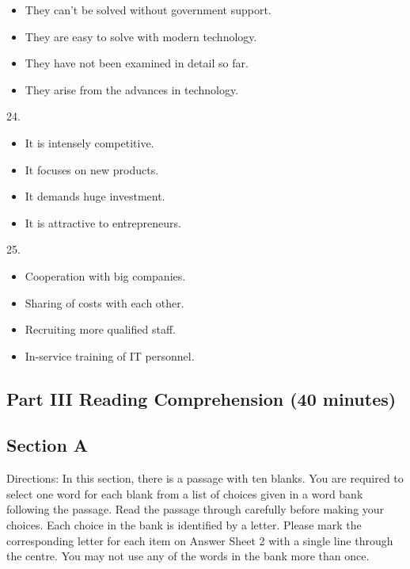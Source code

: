 \documentclass[UTF8,11pt]{ctexart}
\begin{document}
\begin{itemize}[leftmargin=2em,itemsep=.2em,topsep=.4em]\item[A.] They can’t be solved without government support.
\item[B.] They are easy to solve with modern technology.
\item[C.] They have not been examined in detail so far.
\item[D.] They arise from the advances in technology.
\end{itemize}

24.


\begin{itemize}[leftmargin=2em,itemsep=.2em,topsep=.4em]\item[A.] It is intensely competitive.
\item[B.] It focuses on new products.
\item[C.] It demands huge investment.
\item[D.] It is attractive to entrepreneurs.
\end{itemize}

25.


\begin{itemize}[leftmargin=2em,itemsep=.2em,topsep=.4em]\item[A.] Cooperation with big companies.
\item[B.] Sharing of costs with each other.
\item[C.] Recruiting more qualified staff.
\item[D.] In-service training of IT personnel.
\end{itemize}

\subsection*{\textbf{Part} III \textbf{Reading Comprehension} \textbf{(40 minutes)}}


\subsection*{Section A}


Directions: In this section, there is a passage with ten blanks. You are required to select one word for each blank from a list of choices given in a word bank following the passage. Read the passage through carefully before making your choices. Each choice in the bank is identified by a letter. Please mark the corresponding letter for each item on Answer Sheet 2 with a single line through the centre. You may not use any of the words in the bank more than once.
\end{document}
